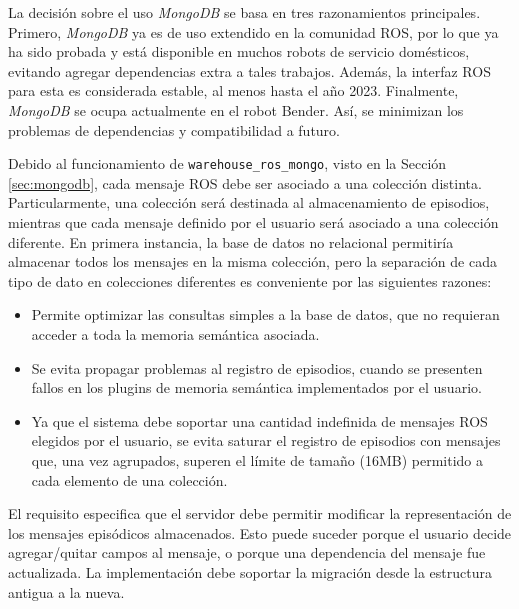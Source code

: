 La decisión sobre el uso \textit{MongoDB} se basa en tres razonamientos principales. Primero, \textit{MongoDB} ya es de uso extendido en la comunidad ROS, por lo que ya ha sido probada y está disponible en muchos robots de servicio domésticos, evitando agregar dependencias extra a tales trabajos. Además, la interfaz ROS para esta es considerada estable, al menos hasta el año 2023.  Finalmente, \textit{MongoDB} se ocupa actualmente en el robot Bender. Así, se minimizan los problemas de dependencias y compatibilidad a futuro.


Debido al funcionamiento de \texttt{warehouse\_ros\_mongo}, visto en la Sección \ref{sec:mongodb}, cada mensaje ROS debe ser asociado a una colección distinta. Particularmente, una colección será destinada al almacenamiento de episodios, mientras que cada mensaje definido por el usuario será asociado a una colección diferente. En primera instancia, la base de datos no relacional permitiría almacenar todos los mensajes en la misma colección, pero la separación de cada tipo de dato en colecciones diferentes es conveniente por las siguientes razones:
\begin{itemize}
\item Permite optimizar las consultas simples a la base de datos, que no requieran acceder a toda la memoria semántica asociada.
\item Se evita propagar problemas al registro de episodios, cuando se presenten fallos en los plugins de memoria semántica implementados por el usuario.
\item Ya que el sistema debe soportar una cantidad indefinida de mensajes ROS elegidos por el usuario, se evita saturar el registro de episodios con mensajes que, una vez agrupados, superen el límite de tamaño (16MB) permitido a cada elemento de una colección.
\end{itemize}

El requisito  especifica que el servidor debe permitir modificar la representación de los mensajes episódicos almacenados. Esto puede suceder porque el usuario decide agregar/quitar campos al mensaje, o porque una dependencia del mensaje fue actualizada. La implementación debe soportar la migración desde la estructura antigua a la nueva.

